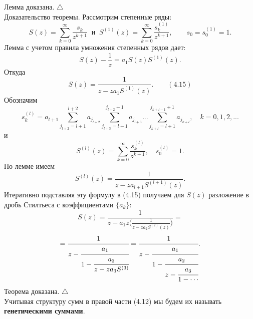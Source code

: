 \documentclass[12 pt, a4 paper]{article}
\theoremstyle{plain}   \newtheorem{Pro}{Задача}
\begin{document}
Лемма доказана. $ \triangle $ \\
{\Large Доказательство теоремы.}
Рассмотрим степенные ряды:
\begin{equation*}
  S(z)=\sum _{k=0}^{\infty}
    \frac{s_k}{z^{k+1}}
	  \; \; и \; \;
	    S^{(1)}(z)=
		  \sum _{k=0}^{\infty}
		    \frac{s_k ^{(1)}}{z^{k+1}},
			  \qquad s_0 =s_0 ^{(1)} =1.
\end{equation*}
Лемма с учетом правила умножения степенных рядов дает:
$$
  S(z)-\frac{1}{z}=a_1 S(z)S^{(1)}(z).
$$
Откуда
$$
  S(z)=\frac{1}{z-za_1 S^{(1)}(z)}.
  \qquad (4.15)
$$
Обозначим
\begin{equation*}
  s_k ^{(l)}=a_{l+1}
    \sum _{j_{l+2}=l+1}^{l+2}a_{j_{l+2}}
	  \sum _{j_{l+3}=l+1}^{j_{l+2}+1}a_{j_{l+3}}...
	    \sum _{j_{k+l}=l+1}^{j_{k+l-1}+1}a_{j_{k+l}},
		  \quad k=0,1,2,...
\end{equation*}
и
\begin{equation*}
  S^{(l)}(z)=\sum _{k=0}^{\infty}
    \frac{s_k ^{(l)}}{z^{k+1}},
	  \quad s_0 ^{(l)}=1.
\end{equation*}
По лемме имеем
$$
  S^{(l)}(z)=\frac{1}
    {z-za_{l+1}S^{(l+1)}(z)}.
$$
Итеративно подставляя эту формулу в (4.15) получаем для
$ S(z) $
разложение в дробь Стилтьеса с коэффициентами
$ \{ a_k \} : $
$$
  S(z)=
    \frac{1}{z-a_1 z \biggl (
	  \frac{1}{z-za_2 S^{(2)}(z)}
	    \biggr ) } =
$$
$$
   =\cfrac{1}{z-
     \cfrac{a_1}{1-
	   \cfrac{a_2}{z-za_3 S^{(3)}
   }}}=
   \cfrac{1}{z-
     \cfrac{a_1}{1-
	   \cfrac{a_2}{z-
	     \cfrac{a_3}{1-\dotsb
	}}}}.
$$
Теорема доказана. $ \triangle $ \\
Учитывая структуру сумм в правой части (4.12) мы будем
их называть
{\bfseries генетическими суммами}.
\newpage
\end{document}
